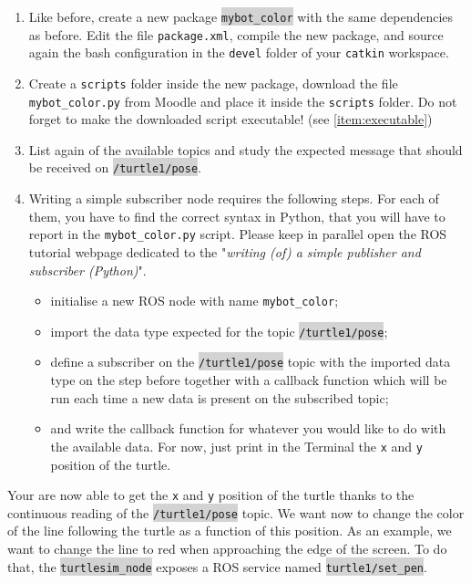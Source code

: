\documentclass[10pt,a4paper,printanswers]{upmc}
\newcounter{mainmemorder}
\newcommand{\save}{\setcounter{mainmemorder}{\value{enumi}}}
\newcommand{\mytext}[1]{\colorbox{lightgray}{\texttt{#1}}}
\begin{document}
\begin{enumerate}
  \item Like before, create a new package \mytext{mybot\_color} with the same dependencies as
        before. Edit the file \texttt{package.xml}, compile the new package, and source again the
        bash configuration in the \texttt{devel} folder of your \texttt{catkin} workspace.
  \item Create a \texttt{scripts} folder inside the new package, download the file
        \texttt{mybot\_color.py} from Moodle and place it inside the \texttt{scripts} folder. Do not
        forget to make the downloaded script executable! (see \ref{item:executable})
  \item List again of the available topics and study the expected message that should be received on
        \mytext{/turtle1/pose}.
  \item Writing a simple subscriber node requires the following steps. For each of them, you have to
        find the correct syntax in Python, that you will have to report in the
        \texttt{mybot\_color.py} script. Please keep in parallel open the ROS tutorial webpage
        dedicated to the "\textit{writing (of) a simple publisher and subscriber (Python)}".
        \begin{itemize}
          \item initialise a new ROS node with name \texttt{mybot\_color};
          \item import the data type expected for the topic \mytext{/turtle1/pose};
          \item define a subscriber on the \mytext{/turtle1/pose} topic with the imported data type
                on the step before together with a callback function which will be run each time a
                new data is present on the subscribed topic;
          \item and write the callback function for whatever you would like to do with the available
                data. For now, just print in the Terminal the \texttt{x} and \texttt{y} position of the
                turtle.
        \end{itemize}
        \save
\end{enumerate}

Your are now able to get the \texttt{x} and \texttt{y} position of the turtle thanks to the
continuous reading of the \mytext{/turtle1/pose} topic. We want now to change the color of the line
following the turtle as a function of this position. As an example, we want to change the line to
red when approaching the edge of the screen. To do that, the \mytext{turtlesim\_node} exposes a
ROS service named \mytext{turtle1/set\_pen}.
\end{document}
